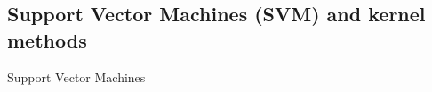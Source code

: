 \documentclass[xcolor=pdftex,dvipsnames,table]{beamer}
\begin{document}


\subsection{Support Vector Machines (SVM) and kernel methods}
\begin{frame}[plain,c]
\begin{center}
\Huge Support Vector Machines
\end{center}
\end{frame}
\end{document}
